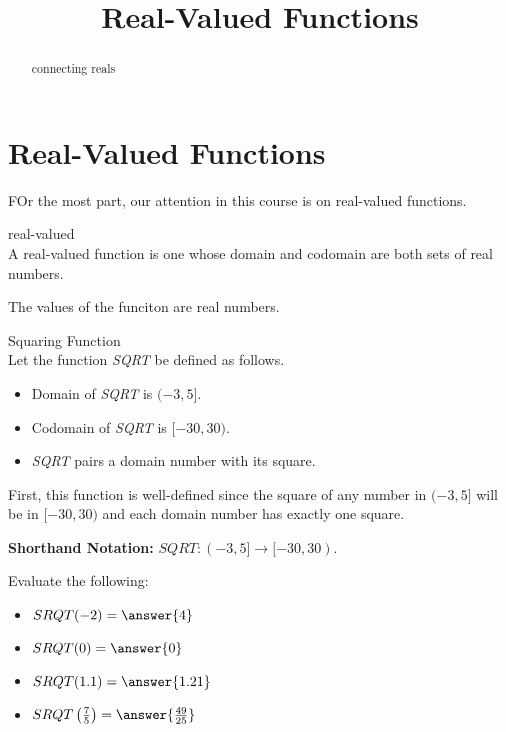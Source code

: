 \documentclass{ximera}
\title{Real-Valued Functions}
\begin{document}
\begin{abstract}
connecting reals
\end{abstract}
\maketitle




\section{Real-Valued Functions}

FOr the most part, our attention in this course is on real-valued functions.




\begin{definition} real-valued \\

A real-valued function is one whose domain and codomain are both sets of real numbers.

\end{definition}
The values of the funciton are real numbers.







\begin{example} Squaring Function \\

Let the function \textit{SQRT} be defined as follows.


\begin{itemize}
\item Domain of \textit{SQRT} is $(-3, 5]$.
\item Codomain of \textit{SQRT} is $[-30, 30)$.
\item \textit{SQRT} pairs a domain number with its square.
\end{itemize}


First, this function is well-defined since the square of any number in $(-3, 5]$ will be in $[-30, 30)$ and each domain number has exactly one square.


\textbf{Shorthand Notation: } $SQRT: (-3, 5] \rightarrow [-30, 30)$.

\begin{question}
Evaluate the following:

\begin{itemize}
	\item $SRQT(-2) = \answer{4}$
	\item $SRQT(0) = \answer{0}$
	\item $SRQT(1.1) = \answer{1.21}$
	\item $SRQT\left(\frac{7}{5}\right) = \answer{\frac{49}{25}}$
\end{itemize}

\end{question}















\end{example}
\end{document}
